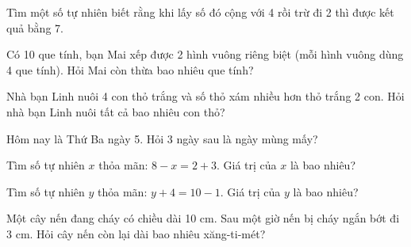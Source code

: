 \begin{ex}
Tìm một số tự nhiên biết rằng khi lấy số đó cộng với 4 rồi trừ đi 2 thì được kết quả bằng 7.
\end{ex}

\begin{ex}
Có 10 que tính, bạn Mai xếp được 2 hình vuông riêng biệt (mỗi hình vuông dùng 4 que tính). Hỏi Mai còn thừa bao nhiêu que tính?
\end{ex}

\begin{ex}
Nhà bạn Linh nuôi 4 con thỏ trắng và số thỏ xám nhiều hơn thỏ trắng 2 con. Hỏi nhà bạn Linh nuôi tất cả bao nhiêu con thỏ?
\end{ex}

\begin{ex}
Hôm nay là Thứ Ba ngày 5. Hỏi 3 ngày sau là ngày mùng mấy?
\end{ex}

\begin{ex}
Tìm số tự nhiên $x$ thỏa mãn: $8 - x = 2 + 3$. Giá trị của $x$ là bao nhiêu?
\end{ex}

\begin{ex}
Tìm số tự nhiên $y$ thỏa mãn: $y + 4 = 10 - 1$. Giá trị của $y$ là bao nhiêu?
\end{ex}

\begin{ex}
Một cây nến đang cháy có chiều dài 10 cm. Sau một giờ nến bị cháy ngắn bớt đi 3 cm. Hỏi cây nến còn lại dài bao nhiêu xăng-ti-mét?
\end{ex}

